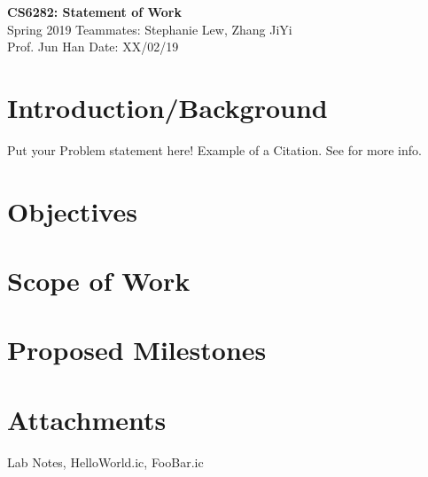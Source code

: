 \documentclass[a4paper, 11pt]{article}
\begin{document}
\noindent
\large\textbf{CS6282: Statement of Work} \hfill  \\
\normalsize Spring 2019 \hfill Teammates: Stephanie Lew, Zhang JiYi \\
Prof. Jun Han \hfill  Date: XX/02/19 \\


\section*{Introduction/Background}
Put your Problem statement here! Example of a Citation\cite{7867716}. See \cite{893287} for more info.
\section*{Objectives}
\lipsum[2]

\section*{Scope of Work}
\lipsum[3]

\section*{Proposed Milestones}
\lipsum[4]

\section*{Attachments}
Lab Notes, HelloWorld.ic, FooBar.ic



\end{document}
